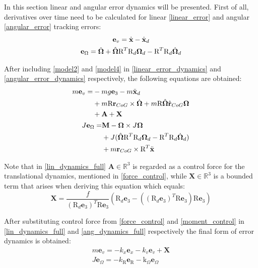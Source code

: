 In this section linear and angular error dynamics will be presented. First of all, derivatives over time need to be calculated for linear \ref{linear_error} and angular \ref{angular_error} tracking errors:
\begin{gather}
	\textbf{e}_v = \dot{\textbf{x}} - \dot{\textbf{x}}_d \label{linear_error_dynamics}\\
	\textbf{e}_\Omega = \dot{\boldsymbol{\Omega}} + \hat{\boldsymbol{\Omega}}\text{R}^T\text{R}_d\boldsymbol{\Omega}_d - \text{R}^T\text{R}_d\dot{\boldsymbol{\Omega}}_d \label{angular_error_dynamics}
\end{gather}

\noindent After including \ref{model2} and \ref{model4} in \ref{linear_error_dynamics} and \ref{angular_error_dynamics} respectively, the following equations are obtained:
\begin{align}
	\label{lin_dynamics_full}
	\begin{split}
		m\textbf{e}_v = & - mg\textbf{e}_3 - m\ddot{\textbf{x}}_d \\
			&+ m\text{R}\textbf{r}_{CoG}  \times \dot{\boldsymbol{\Omega}} + m\text{R}\hat{\boldsymbol{\Omega}}\hat{\textbf{r}}_{CoG}\boldsymbol{\Omega} \\
			&+ \textbf{A} + \textbf{X}	
	\end{split} \\
	\label{ang_dynamics_full}
	\begin{split}
		J\textbf{e}_\Omega = &\textbf{M} - \boldsymbol{\Omega} \times J\boldsymbol{\Omega} \\
			&+ J(\hat{\boldsymbol{\Omega}}\text{R}^T\text{R}_d\boldsymbol{\Omega}_d - \text{R}^T\text{R}_d\dot{\boldsymbol{\Omega}}_d) \\
			&+ m\textbf{r}_{CoG} \times \text{R}^T \ddot{\textbf{x}}
	\end{split}
\end{align}

\noindent Note that in \ref{lin_dynamics_full} $\textbf{A}\in \mathbb{\text{R}}^3$ is regarded as a control force for the translational dynamics, mentioned in \ref{force_control}, while $\textbf{X}\in\mathbb{\text{R}}^3$ is a bounded term that arises when deriving this equation which equals:
\begin{equation}
	\textbf{X} = \frac{f}{(\text{R}_d\textbf{e}_3)^T\text{R}\textbf{e}_3}(\text{R}_d \textbf{e}_3 - ((\text{R}_d\textbf{e}_3)^T\text{R}\textbf{e}_3)\text{R}\textbf{e}_3)
\end{equation}

\noindent After substituting control force from \ref{force_control} and \ref{moment_control} in \ref{lin_dynamics_full} and \ref{ang_dynamics_full} respectively the final form of error dynamics is obtained:
\begin{gather}
	m\textbf{e}_v = -k_x \textbf{e}_x - k_v \textbf{e}_v + \textbf{X} \label{error_dynamics_linear}\\ 
	J\textbf{e}_\Omega = -k_\text{R} \textbf{e}_\text{R} - \text{k}_\Omega \textbf{e}_\Omega \label{error_dynamics_angular}
\end{gather}

